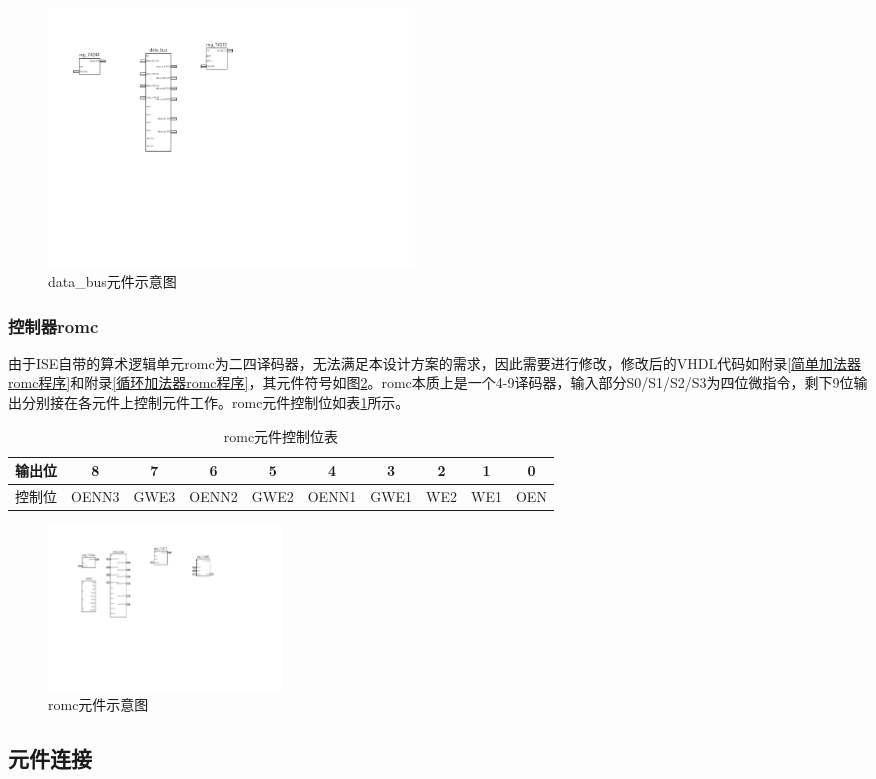 \documentclass[a4paper]{ctexart}
\begin{document}
\begin{spacing}{1.3}
	\begin{figure}[htbp]
		\centering
		\includegraphics[width=0.47\textwidth]{figure/data_bus.pdf}
		\caption{data\_bus元件示意图}\label{fig:data_bus}
	\end{figure}
	\newpage

	\subsubsection{控制器romc}
	由于ISE自带的算术逻辑单元romc为二四译码器，无法满足本设计方案的需求，因此需要进行修改，修改后的VHDL代码如附录\ref{简单加法器romc程序}和附录\ref{循环加法器romc程序}，其元件符号如图\ref{fig:romc}。romc本质上是一个4-9译码器，输入部分S0/S1/S2/S3为四位微指令，剩下9位输出分别接在各元件上控制元件工作。romc元件控制位如表\ref{tab:控制位表}所示。
	\begin{table}[htbp]
		\centering
		\caption{romc元件控制位表}
		\begin{tabular}{|c|c|c|c|c|c|c|c|c|c|}
			\hline
			输出位 & 8     & 7    & 6     & 5    & 4     & 3    & 2   & 1   & 0   \\
			\hline
			控制位 & OENN3 & GWE3 & OENN2 & GWE2 & OENN1 & GWE1 & WE2 & WE1 & OEN \\
			\hline
		\end{tabular}
		\label{tab:控制位表}
	\end{table}

	\begin{figure}[htbp]
		\centering
		\includegraphics[width=0.3\textwidth]{figure/romc.pdf}
		\caption{romc元件示意图}\label{fig:romc}
	\end{figure}

	\subsection{元件连接}

\end{spacing}
\end{document}

